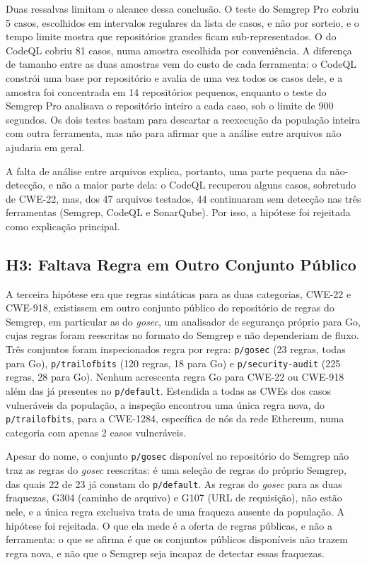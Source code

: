 Duas ressalvas limitam o alcance dessa conclusão. O teste do Semgrep Pro cobriu 5 casos, escolhidos em intervalos regulares da lista de casos, e não por sorteio, e o tempo limite mostra que repositórios grandes ficam sub-representados. O do CodeQL cobriu 81 casos, numa amostra escolhida por conveniência. A diferença de tamanho entre as duas amostras vem do custo de cada ferramenta: o CodeQL constrói uma base por repositório e avalia de uma vez todos os casos dele, e a amostra foi concentrada em 14 repositórios pequenos, enquanto o teste do Semgrep Pro analisava o repositório inteiro a cada caso, sob o limite de 900 segundos. Os dois testes bastam para descartar a reexecução da população inteira com outra ferramenta, mas não para afirmar que a análise entre arquivos não ajudaria em geral.

A falta de análise entre arquivos explica, portanto, uma parte pequena da não-detecção, e não a maior parte dela: o CodeQL recuperou alguns casos, sobretudo de CWE-22, mas, dos 47 arquivos testados, 44 continuaram sem detecção nas três ferramentas (Semgrep, CodeQL e SonarQube). Por isso, a hipótese foi rejeitada como explicação principal.

\subsection{H3: Faltava Regra em Outro Conjunto Público}
\label{subsec:h3}

A terceira hipótese era que regras sintáticas para as duas categorias, CWE-22 e CWE-918, existissem em outro conjunto público do repositório de regras do Semgrep, em particular as do \textit{gosec}, um analisador de segurança próprio para Go, cujas regras foram reescritas no formato do Semgrep e não dependeriam de fluxo. Três conjuntos foram inspecionados regra por regra: \texttt{p/gosec} (23 regras, todas para Go), \texttt{p/trailofbits} (120 regras, 18 para Go) e \texttt{p/security-audit} (225 regras, 28 para Go). Nenhum acrescenta regra Go para CWE-22 ou CWE-918 além das já presentes no \texttt{p/default}. Estendida a todas as CWEs dos casos vulneráveis da população, a inspeção encontrou uma única regra nova, do \texttt{p/trailofbits}, para a CWE-1284, específica de nós da rede Ethereum, numa categoria com apenas 2 casos vulneráveis.

Apesar do nome, o conjunto \texttt{p/gosec} disponível no repositório do Semgrep não traz as regras do \textit{gosec} reescritas: é uma seleção de regras do próprio Semgrep, das quais 22 de 23 já constam do \texttt{p/default}. As regras do \textit{gosec} para as duas fraquezas, G304 (caminho de arquivo) e G107 (URL de requisição), não estão nele, e a única regra exclusiva trata de uma fraqueza ausente da população. A hipótese foi rejeitada. O que ela mede é a oferta de regras públicas, e não a ferramenta: o que se afirma é que os conjuntos públicos disponíveis não trazem regra nova, e não que o Semgrep seja incapaz de detectar essas fraquezas.

